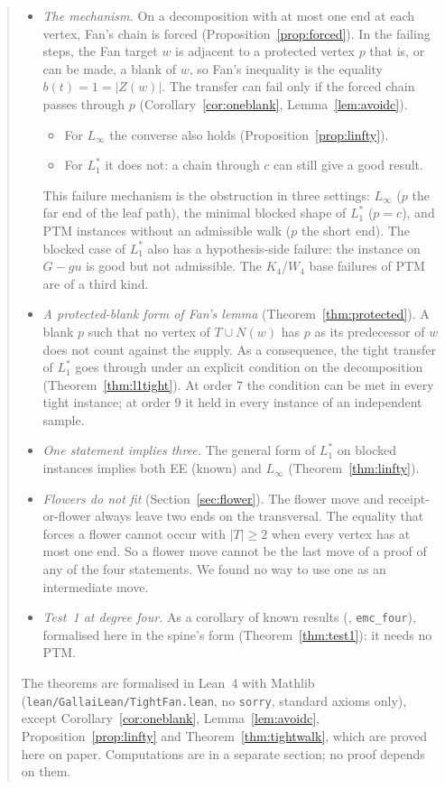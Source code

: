 \documentclass[11pt]{amsart}
\theoremstyle{definition}
\begin{document}
\begin{abstract}
\begin{itemize}
\item \emph{The mechanism.} On a decomposition with at most one end at each vertex, Fan's chain is
forced (Proposition~\ref{prop:forced}). In the failing steps, the Fan target $w$ is adjacent to a
protected vertex $p$ that is, or can be made, a blank of $w$, so Fan's inequality is the equality
$b(t)=1=|Z(w)|$. The transfer can fail only if the forced chain passes through $p$
(Corollary~\ref{cor:oneblank}, Lemma~\ref{lem:avoidc}).
  \begin{itemize}
  \item For $L_\infty$ the converse also holds (Proposition~\ref{prop:linfty}).
  \item For $L_1^*$ it does not: a chain through $c$ can still give a good result.
  \end{itemize}
This failure mechanism is the obstruction in three settings: $L_\infty$ ($p$ the far end of the
leaf path), the minimal blocked shape of $L_1^*$ ($p=c$), and PTM instances without an admissible
walk ($p$ the short end). The blocked case of $L_1^*$ also has a hypothesis-side failure: the
instance on $G-gu$ is good but not admissible. The $K_4$/$W_4$ base failures of PTM are of a
third kind.
\item \emph{A protected-blank form of Fan's lemma} (Theorem~\ref{thm:protected}). A blank $p$ such
that no vertex of $T\cup N(w)$ has $p$ as its predecessor of $w$ does not count against the supply.
As a consequence, the tight transfer of $L_1^*$ goes through under an explicit condition on the
decomposition (Theorem~\ref{thm:l1tight}). At order $7$ the condition can be met in every tight
instance; at order $9$ it held in every instance of an independent sample.
\item \emph{One statement implies three.} The general form of $L_1^*$ on blocked instances implies
both EE (known) and $L_\infty$ (Theorem~\ref{thm:linfty}).
\item \emph{Flowers do not fit} (Section~\ref{sec:flower}). The flower move and receipt-or-flower
always leave two ends on the transversal. The equality that forces a flower cannot occur with
$|T|\ge2$ when every vertex has at most one end. So a flower move cannot be the last move of a
proof of any of the four statements. We found no way to use one as an intermediate move.
\item \emph{Test~1 at degree four.} As a corollary of known results (\cite[Remark~7.3]{TM},
\texttt{emc\_four}), formalised here in the spine's form (Theorem~\ref{thm:test1}): it needs no PTM.
\end{itemize}
The theorems are formalised in Lean~4 with Mathlib (\texttt{lean/GallaiLean/TightFan.lean}, no
\texttt{sorry}, standard axioms only), except Corollary~\ref{cor:oneblank},
Lemma~\ref{lem:avoidc}, Proposition~\ref{prop:linfty} and Theorem~\ref{thm:tightwalk}, which are
proved here on paper. Computations are in a separate section; no proof depends on them.
\end{abstract}
\maketitle
\end{document}
